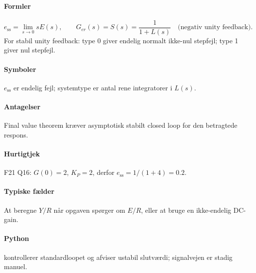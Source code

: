 \paragraph{Formler}
\[
e_{\mathrm{ss}}=\lim_{s\to0}sE(s),\qquad
G_{er}(s)=S(s)=\frac1{1+L(s)}\quad\text{(negativ unity feedback)}.
\]
For stabil unity feedback: type 0 giver endelig normalt ikke-nul stepfejl; type 1
giver nul stepfejl.

\paragraph{Symboler}
\(e_{\mathrm{ss}}\) er endelig fejl; systemtype er antal rene integratorer i \(L(s)\).

\paragraph{Antagelser}
Final value theorem kræver asymptotisk stabilt closed loop for den betragtede respons.

\paragraph{Hurtigtjek}
F21 Q16: \(G(0)=2\), \(K_P=2\), derfor \(e_{\mathrm{ss}}=1/(1+4)=0.2\).

\paragraph{Typiske fælder}
At beregne \(Y/R\) når opgaven spørger om \(E/R\), eller at bruge en ikke-endelig DC-gain.

\paragraph{Python}
 kontrollerer
standardloopet og afviser ustabil slutværdi; signalvejen er stadig manuel.
